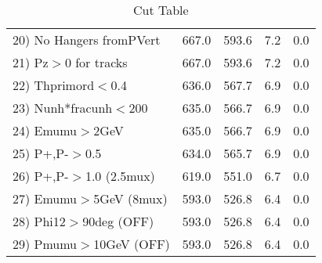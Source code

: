 \begin{table}[h!]
\begin{tabular}{||l||r|r|r|r||}
 20) No Hangers fromPVert &       667.0 &       593.6 &         7.2 &         0.0 \\
 21) Pz$>$0 for tracks    &       667.0 &       593.6 &         7.2 &         0.0 \\
 22) Thprimord$<$0.4      &       636.0 &       567.7 &         6.9 &         0.0 \\
 23) Nunh*fracunh$<$200   &       635.0 &       566.7 &         6.9 &         0.0 \\
 24) Emumu$>$2GeV         &       635.0 &       566.7 &         6.9 &         0.0 \\
 25) P+,P-$>$0.5          &       634.0 &       565.7 &         6.9 &         0.0 \\
 26) P+,P-$>$1.0 (2.5mux) &       619.0 &       551.0 &         6.7 &         0.0 \\
 27) Emumu$>$5GeV  (8mux) &       593.0 &       526.8 &         6.4 &         0.0 \\
 28) Phi12$>$90deg  (OFF) &       593.0 &       526.8 &         6.4 &         0.0 \\
 29) Pmumu$>$10GeV  (OFF) &       593.0 &       526.8 &         6.4 &         0.0 \\
 \hline
 \hline
 \end{tabular}
 \caption{Cut Table \cohpip }
 \label{tab-cut_copip}
 \end{table}
